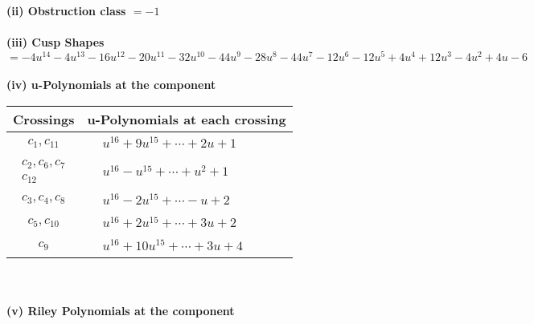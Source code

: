 \documentclass[1p]{elsarticle_modified}
\theoremstyle{definition}
\begin{document}
\flushleft \textbf{(ii) Obstruction class $= -1$}\\~\\
\flushleft \textbf{(iii) Cusp Shapes $= -4 u^{14}-4 u^{13}-16 u^{12}-20 u^{11}-32 u^{10}-44 u^9-28 u^8-44 u^7-12 u^6-12 u^5+4 u^4+12 u^3-4 u^2+4 u-6$}\\~\\
\newpage\renewcommand{\arraystretch}{1}
\flushleft \textbf{(iv) u-Polynomials at the component}\newline \\
\begin{tabular}{m{50pt}|m{274pt}}
Crossings & \hspace{64pt}u-Polynomials at each crossing \\
\hline $$\begin{aligned}c_{1},c_{11}\end{aligned}$$&$\begin{aligned}
&u^{16}+9 u^{15}+\cdots+2 u+1
\end{aligned}$\\
\hline $$\begin{aligned}c_{2},c_{6},c_{7}\\c_{12}\end{aligned}$$&$\begin{aligned}
&u^{16}- u^{15}+\cdots+u^2+1
\end{aligned}$\\
\hline $$\begin{aligned}c_{3},c_{4},c_{8}\end{aligned}$$&$\begin{aligned}
&u^{16}-2 u^{15}+\cdots- u+2
\end{aligned}$\\
\hline $$\begin{aligned}c_{5},c_{10}\end{aligned}$$&$\begin{aligned}
&u^{16}+2 u^{15}+\cdots+3 u+2
\end{aligned}$\\
\hline $$\begin{aligned}c_{9}\end{aligned}$$&$\begin{aligned}
&u^{16}+10 u^{15}+\cdots+3 u+4
\end{aligned}$\\
\hline
\end{tabular}\\~\\
\newpage\renewcommand{\arraystretch}{1}
\flushleft \textbf{(v) Riley Polynomials at the component}\newline \\
\end{document}
